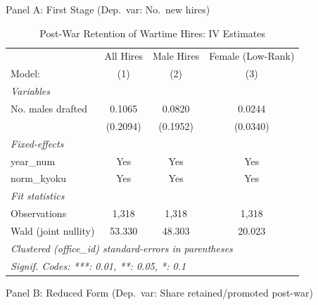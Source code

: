 \begin{table}[htbp]
\centering
\caption{Post-War Retention of Wartime Hires: IV Estimates}
\label{tab:postwar-iv}
\small
\begin{threeparttable}

Panel A: First Stage (Dep.\ var: No.\ new hires)
\medskip

\begin{tabular}{lccc}
   \tabularnewline \midrule \midrule
                        & All Hires     & Male Hires         & Female (Low-Rank) \\   
   Model:               & (1)           & (2)                & (3)\\  
   \midrule
   \emph{Variables}\\
   No. males drafted    & 0.1065        & 0.0820             & 0.0244\\   
                        & (0.2094)      & (0.1952)           & (0.0340)\\   
   \midrule
   \emph{Fixed-effects}\\
   year\_num            & Yes           & Yes                & Yes\\  
   norm\_kyoku          & Yes           & Yes                & Yes\\  
   \midrule
   \emph{Fit statistics}\\
   Observations         & 1,318         & 1,318              & 1,318\\  
   Wald (joint nullity) & 53.330        & 48.303             & 20.023\\  
   \midrule \midrule
   \multicolumn{4}{l}{\emph{Clustered (office\_id) standard-errors in parentheses}}\\
   \multicolumn{4}{l}{\emph{Signif. Codes: ***: 0.01, **: 0.05, *: 0.1}}\\
\end{tabular}

\bigskip

Panel B: Reduced Form (Dep.\ var: Share retained/promoted post-war)
\medskip


\end{threeparttable}
\end{table}
